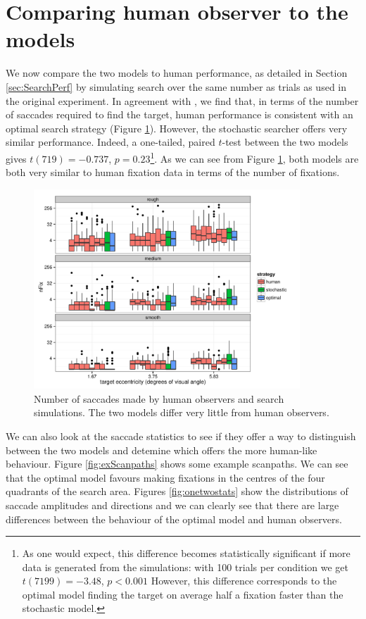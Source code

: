 \documentclass[preprint, authoryear]{elsarticle} %
\begin{document}
\section{Comparing human observer to the models}

We now compare the two models to human performance, as detailed in Section \ref{sec:SearchPerf} by simulating search over the same number as trials as used in the original experiment. In agreement with \citet{najemnik-geisler2008}, we find that, in terms of the number of saccades required to find the target, human performance is consistent with an optimal search strategy (Figure \ref{fig:numFixHumanModel}). However, the stochastic searcher offers very similar performance. Indeed, a one-tailed, paired $t$-test between the two models gives $t(719)=-0.737$, $p=0.23$\footnote{As one would expect, this difference becomes statistically significant if more data is generated from the simulations: with 100 trials per condition we get $t(7199)=-3.48$, $p<0.001$ However, this difference corresponds to the optimal model finding the target on average half a fixation faster than the stochastic model.}. As we can see from Figure \ref{fig:numFixHumanModel}, both models are both very similar to human fixation data in terms of the number of fixations.

\begin{figure}
	\centering
	\includegraphics[width=10cm]{fig/numFixHumanModel.pdf}
	\caption{Number of saccades made by human observers and search simulations. The two models differ very little from human observers.} 
	\label{fig:numFixHumanModel}
\end{figure}

We can also look at the saccade statistics to see if they offer a way to distinguish between the two models and detemine which offers the more human-like behaviour. Figure \ref{fig:exScanpaths} shows some example scanpaths. We can see that the optimal model favours making fixations in the centres of the four quadrants of the search area. Figures \ref{fig:onetwostats} show the distributions of saccade amplitudes and directions and we can clearly see that there are large differences between the behaviour of the optimal model and human observers. 
\end{document}
